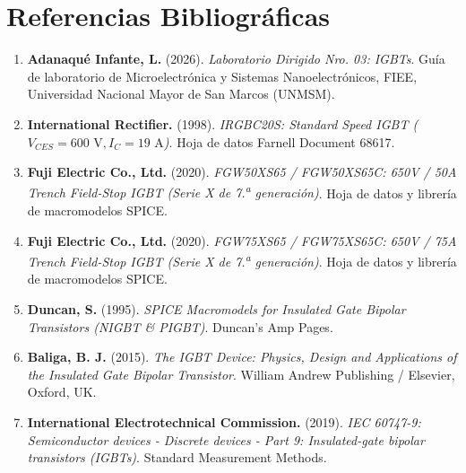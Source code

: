 \documentclass[11pt,a4paper]{article}
\begin{document}
\section{Referencias Bibliográficas}
{\small
\begin{enumerate}[leftmargin=*, itemsep=0.5pt, topsep=1pt, parsep=0pt]
  \item \textbf{Adanaqué Infante, L.} (2026). \textit{Laboratorio Dirigido Nro. 03: IGBTs}. Guía de laboratorio de Microelectrónica y Sistemas Nanoelectrónicos, FIEE, Universidad Nacional Mayor de San Marcos (UNMSM).
  \item \textbf{International Rectifier.} (1998). \textit{IRGBC20S: Standard Speed IGBT ($V_{CES} = 600\text{ V}, I_C = 19\text{ A}$)}. Hoja de datos Farnell Document 68617.
  \item \textbf{Fuji Electric Co., Ltd.} (2020). \textit{FGW50XS65 / FGW50XS65C: 650V / 50A Trench Field-Stop IGBT (Serie X de 7.\textsuperscript{a} generación)}. Hoja de datos y librería de macromodelos SPICE.
  \item \textbf{Fuji Electric Co., Ltd.} (2020). \textit{FGW75XS65 / FGW75XS65C: 650V / 75A Trench Field-Stop IGBT (Serie X de 7.\textsuperscript{a} generación)}. Hoja de datos y librería de macromodelos SPICE.
  \item \textbf{Duncan, S.} (1995). \textit{SPICE Macromodels for Insulated Gate Bipolar Transistors (NIGBT \& PIGBT)}. Duncan's Amp Pages.
  \item \textbf{Baliga, B. J.} (2015). \textit{The IGBT Device: Physics, Design and Applications of the Insulated Gate Bipolar Transistor}. William Andrew Publishing / Elsevier, Oxford, UK.
  \item \textbf{International Electrotechnical Commission.} (2019). \textit{IEC 60747-9: Semiconductor devices - Discrete devices - Part 9: Insulated-gate bipolar transistors (IGBTs)}. Standard Measurement Methods.
\end{enumerate}
}
\end{document}
